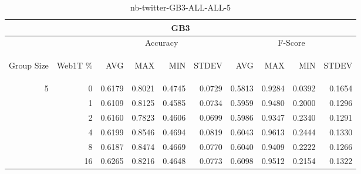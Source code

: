 \begin{center}
\begin{table}[htbp]
\begin{center}
\begin{tabular}{ | r | r | r | r | r | r | r | r | r | r |}
\hline
\multicolumn{10}{|c|}{GB3}\\
\hline
 & & \multicolumn{4}{|c|}{Accuracy} & \multicolumn{4}{|c|}{F-Score}\\ \cline{3-10}
\begin{sideways}Group Size\end{sideways} & \begin{sideways}Web1T \%\end{sideways} & \begin{sideways}AVG\end{sideways} & \begin{sideways}MAX\end{sideways} & \begin{sideways}MIN\end{sideways} & \begin{sideways}STDEV\end{sideways} & \begin{sideways}AVG\end{sideways} & \begin{sideways}MAX\end{sideways} & \begin{sideways}MIN\end{sideways} & \begin{sideways}STDEV\end{sideways}\\
\hline
\multirow{5}{*}{5}
 & 0 & 0.6179 & 0.8021 & 0.4745 & 0.0729 & 0.5813 & 0.9284 & 0.0392 & 0.1654\\ \cline{2-10}
 & 1 & 0.6109 & 0.8125 & 0.4585 & 0.0734 & 0.5959 & 0.9480 & 0.2000 & 0.1296\\ \cline{2-10}
 & 2 & 0.6160 & 0.7823 & 0.4606 & 0.0699 & 0.5986 & 0.9347 & 0.2340 & 0.1291\\ \cline{2-10}
 & 4 & 0.6199 & 0.8546 & 0.4694 & 0.0819 & 0.6043 & 0.9613 & 0.2444 & 0.1330\\ \cline{2-10}
 & 8 & 0.6187 & 0.8474 & 0.4669 & 0.0770 & 0.6040 & 0.9409 & 0.2222 & 0.1266\\ \cline{2-10}
 & 16 & 0.6265 & 0.8216 & 0.4648 & 0.0773 & 0.6098 & 0.9512 & 0.2154 & 0.1322\\ \cline{2-10}
\hline
\end{tabular}
\caption{nb-twitter-GB3-ALL-ALL-5}
\label{table:nb-twitter-GB3-ALL-ALL-5}
\end{center}
\end{table}
\end{center}

